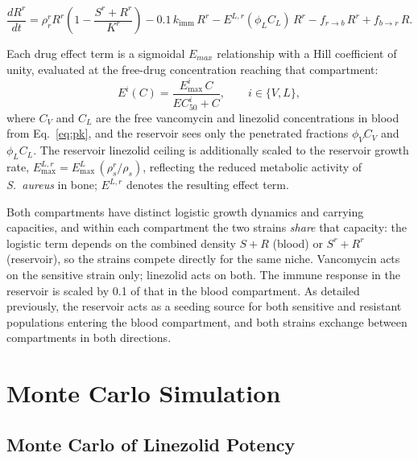 \documentclass[12pt, draftcls, onecolumn]{IEEEtran}
\begin{document}
\begin{equation}
\frac{dR^r}{dt}
= \rho_{r}^{r} R^{r} \left( 1 - \frac{S^r + R^r}{K^r} \right)
- 0.1\, k_{\text{imm}}\, R^r
- E^{L,r}(\phi_{L} C_L)\, R^r
- f_{r\to b}\, R^r + f_{b\to r}\, R .
\label{eq:dRrdt}
\end{equation}



Each drug effect term is a sigmoidal $E_{max}$ relationship with a Hill
coefficient of unity, evaluated at the free-drug concentration reaching
that compartment:
\begin{equation}
E^{i}(C) = \frac{E_{\max}^{i}\, C}{EC_{50}^{i} + C},
\qquad i \in \{V, L\},
\label{eq:hill}
\end{equation}
where $C_V$ and $C_L$ are the free vancomycin and linezolid
concentrations in blood from Eq.~\eqref{eq:pk}, and the reservoir sees
only the penetrated fractions $\phi_V C_V$ and $\phi_L C_L$. The reservoir
linezolid ceiling is additionally scaled to the reservoir growth rate,
$E_{\max}^{L,r} = E_{\max}^{L}\,(\rho_s^r/\rho_s)$, reflecting the reduced
metabolic activity of \textit{S.~aureus} in bone; $E^{L,r}$ denotes the
resulting effect term.

Both compartments have distinct logistic growth dynamics and carrying
capacities, and within each compartment the two strains \emph{share} that
capacity: the logistic term depends on the combined density $S+R$ (blood)
or $S^r+R^r$ (reservoir), so the strains compete directly for the same
niche. Vancomycin acts on the sensitive strain only; linezolid acts on
both. The immune response in the reservoir is scaled by 0.1 of that in the
blood compartment. As detailed previously, the reservoir acts as a seeding
source for both sensitive and resistant populations entering the blood
compartment, and both strains exchange between compartments in both
directions.



\maketitle
\section{Monte Carlo Simulation}

\subsection{Monte Carlo of Linezolid Potency}
\end{document}
